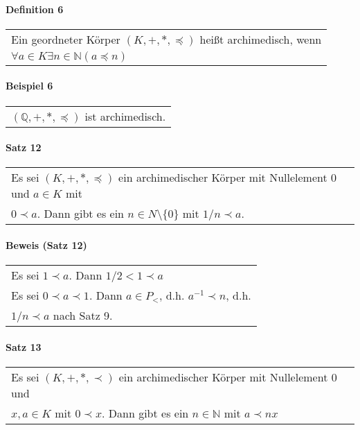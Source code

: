 \documentclass[a4paper]{scrartcl}
\begin{document}
\paragraph{Definition 6}
\begin{tabbing}
\begin{tabular}{l}
Ein geordneter Körper $(K,+,*,\preceq)$ heißt archimedisch, wenn \\
$\forall a\in K\exists n\in\mathbb{N} (a\preceq n)$
\end{tabular}
\end{tabbing}

\paragraph{Beispiel 6}
\begin{tabbing}
\begin{tabular}{l}
$(\mathbb{Q},+,*,\preceq)$ ist archimedisch.
\end{tabular}
\end{tabbing}

\paragraph{Satz 12}
\begin{tabbing}
\begin{tabular}{l}
Es sei $(K,+,*,\preceq)$ ein archimedischer Körper mit Nullelement 0 und $a\in K$ mit\\
$0\prec a$. Dann gibt es ein $n\in N\setminus\{ 0\}$ mit $1/n \prec a$.
\end{tabular}
\end{tabbing}

\paragraph{Beweis (Satz 12)}
\begin{tabbing}
\begin{tabular}{l}
Es sei $1\prec a$. Dann $1/2 < 1 \prec a$\\
Es sei $0 \prec a \prec 1$. Dann $a\in P_<$, d.h. $a^{-1} \prec n$, d.h.\\
$1/n \prec a $ nach Satz 9.
\end{tabular}
\end{tabbing}

\paragraph{Satz 13}
\begin{tabbing}
\begin{tabular}{l}
Es sei $(K,+,*,\prec)$ ein archimedischer Körper mit Nullelement 0 und \\
$x,a\in K$ mit $0 \prec x$. Dann gibt es ein $n\in \mathbb{N}$ mit $a\prec nx$
\end{tabular}
\end{tabbing}
\end{document}
